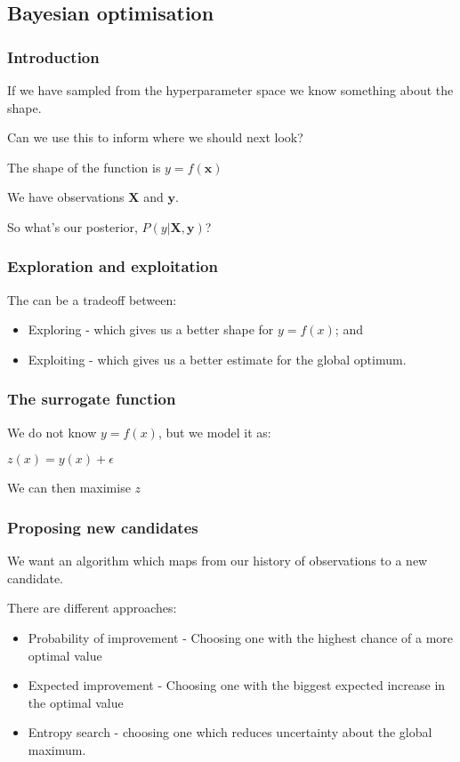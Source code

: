 
\subsection{Bayesian optimisation}

\subsubsection{Introduction}

If we have sampled from the hyperparameter space we know something about the shape.

Can we use this to inform where we should next look?

The shape of the function is \(y=f(\mathbf x)\)

We have observations \(\mathbf X\) and \(\mathbf y\).

So what's our posterior, \(P(y|\mathbf X, \mathbf y)\)?

\subsubsection{Exploration and exploitation}

The can be a tradeoff between:

\begin{itemize}
\item Exploring - which gives us a better shape for \(y=f(x)\); and
\item Exploiting - which gives us a better estimate for the global optimum.
\end{itemize}

\subsubsection{The surrogate function}

We do not know \(y=f(x)\), but we model it as:

\(z(x)=y(x)+\epsilon\)

We can then maximise \(z\)

\subsubsection{Proposing new candidates}

We want an algorithm which maps from our history of observations to a new candidate.

There are different approaches:

\begin{itemize}
\item Probability of improvement - Choosing one with the highest chance of a more optimal value
\item Expected improvement - Choosing one with the biggest expected increase in the optimal value
\item Entropy search - choosing one which reduces uncertainty about the global maximum.
\end{itemize}

